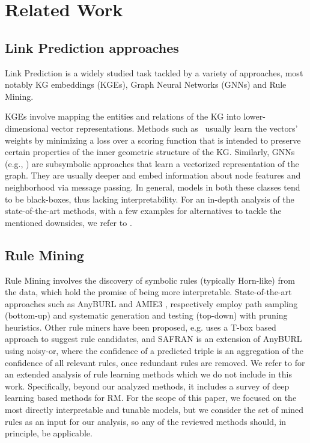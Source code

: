 \documentclass[a4paper,UKenglish,cleveref, autoref, thm-restate]{tgdk-v2021}
\begin{document}
\section{Related Work}

\subsection{Link Prediction approaches}
Link Prediction is a widely studied task tackled by a variety of approaches, most notably KG embeddings (KGEs), Graph Neural Networks (GNNs) and Rule Mining. 

KGEs involve mapping the entities and relations of the KG into lower-dimensional vector representations. Methods such as~\cite{bordes_translating_2013, sun_rotate_2019,trouillon_complex_2016} usually learn the vectors' weights by minimizing a loss over a scoring function that is intended to preserve certain properties of the inner geometric structure of the KG. Similarly, GNNs (e.g., \cite{kipf_semi-supervised_2016,zeb_complex_2022}) are subsymbolic approaches that learn a vectorized representation of the graph. They are usually deeper and embed information about node features and neighborhood via message passing. In general, models in both these classes tend to be black-boxes, thus lacking interpretability. For an in-depth analysis of the state-of-the-art methods, with a few examples for alternatives to tackle the mentioned downsides, we refer to \cite{arrar_comprehensive_2024}.

\subsection{Rule Mining}
Rule Mining \cite{zeng_logical_2023} involves the discovery of symbolic rules (typically Horn-like) from the data, which hold the promise of being more interpretable. State-of-the-art approaches such as AnyBURL \cite{meilicke_anytime_2024} and AMIE3 \cite{harth_fast_2020}, respectively employ path sampling (bottom-up) and systematic generation and testing (top-down) with pruning heuristics.
Other rule miners have been proposed, e.g. \cite{pirro_relatedness_2020} uses a T-box based approach to suggest rule candidates, and SAFRAN \cite{ott_safran_2021} is an extension of AnyBURL using noisy-or, where the confidence of a predicted triple is an aggregation of the confidence of all relevant rules, once redundant rules are removed. 
We refer to \cite{wu_rule_2023} for an extended analysis of rule learning methods which we do not include in this work. Specifically, beyond our analyzed methods, it includes a survey of deep learning based methods for RM. For the scope of this paper, we focused on the most directly interpretable and tunable models, but we consider the set of mined rules as an input for our analysis, so any of the reviewed methods should, in principle, be applicable.
\end{document}
